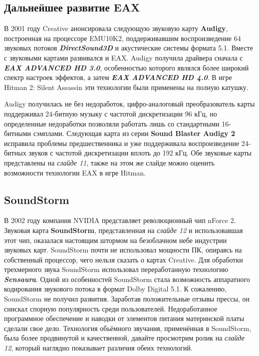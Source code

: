 \documentclass[a4paper,12pt]{extarticle}
\begin{document}
	\subsection{Дальнейшее развитие EAX}
	В 2001 году Creative анонсировала следующую звуковую карту \textbf{Audigy}, построенная на процессоре EMU10K2, поддерживавшим воспроизведение 64 звуковых потоков \textbf{\textit{DirectSound3D}} и акустические системы формата 5.1. Вместе с звуковыми картами развивался и EAX. Audigy получила драйвера сначала с \textbf{\textit{EAX ADVANCED HD 3.0}}, особенностью которого являлся более широкий спектр настроек эффектов, а затем \textbf{\textit{EAX ADVANCED HD 4.0}}. В игре Hitman 2: Silent Assassin эти технологии были применены на полную катушку.
	
	Audigy получилась не без недоработок, цифро-аналоговый преобразователь карты поддерживал 24-битную музыку с частотой дискретизации 96 кГц, но определенные недоработки позволяли работать лишь со стандартными 16-битными сэмплами. Следующая карта из серии \textbf{Sound Blaster Audigy 2} исправила проблемы предшественника и уже поддерживала воспроизведение 24-битных звуков с частотой дискретизации вплоть до 192 кГц. Обе звуковые карты представлены на \textit{слайде 11}, также на этом же слайде можно оценить возможности технологии EAX в игре Hitman.
	
	\subsection{SoundStorm}
	В 2002 году компания NVIDIA представляет революционный чип nForce 2. Звуковая карта \textbf{SoundStorm}, представленная на \textit{слайде 12} и использовавшая этот чип, оказалася настоящим штормом на безоблачном небе индустрии звуковых карт. SoundStorm почти не использовал мощности ПК, опираясь на собственный процессор, чего нельзя сказать о картах Creative. Для обработки трехмерного звука SoundStorm использовал переработанную технологию  \textbf{\textit{Sensaura}}. Одной из особенностей SoundStorm стала возможность аппаратного кодирования звукового потока в формат Dolby Digital 5.1. К сожалению, SoundStorm не получил развития. Заработав положительные отзывы прессы, он снискал спорную популярность среди пользователей. Недоработанное программное обеспечение и наводки от элементов питания материнской платы сделали свое дело. Технология обьёмного звучания, применённая в SoundStorm, была более продвинутой и качественной, давайте просмотрим ролик на \textit{слайде 12}, который наглядно показывает различия обеих технологий.
	
\end{document}
